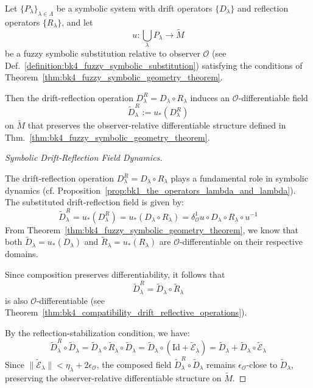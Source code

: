 \begin{theorem}
\label{thm:bk4_compatibility_drift_reflective_operations}

Let $\{P_\lambda\}_{\lambda \in \Lambda}$ be a symbolic system with drift operators $\{D_\lambda\}$ and reflection operators $\{R_\lambda\}$, and let
\[
u : \bigcup_\lambda P_\lambda \to \tilde{M}
\]
be a fuzzy symbolic substitution relative to observer $\mathcal{O}$ (see Def.~\ref{definition:bk4_fuzzy_symbolic_substitution}) satisfying the conditions of Theorem~\ref{thm:bk4_fuzzy_symbolic_geometry_theorem}.

Then the drift-reflection operation \( D_\lambda^R = D_\lambda \circ R_\lambda \) induces an $\mathcal{O}$-differentiable field
\[
\tilde{D}_\lambda^R := u_*(D_\lambda^R)
\]
on $\tilde{M}$ that preserves the observer-relative differentiable structure defined in Thm.~\ref{thm:bk4_fuzzy_symbolic_geometry_theorem}.
\end{theorem}

\begin{proof}[Symbolic Drift-Reflection Field Dynamics]
\label{proof:bk4_drift_reflection_field}

The drift-reflection operation \( D_\lambda^R = D_\lambda \circ R_\lambda \) plays a fundamental role in symbolic dynamics (cf. Proposition~\ref{prop:bk1_the_operators_lambda_and_lambda}). The substituted drift-reflection field is given by:
\[
\tilde{D}_\lambda^R = u_*(D_\lambda^R) = u_*(D_\lambda \circ R_\lambda) = \delta^1_\mathcal{O}u \circ D_\lambda \circ R_\lambda \circ u^{-1}
\]
From Theorem~\ref{thm:bk4_fuzzy_symbolic_geometry_theorem}, we know that both \( \tilde{D}_\lambda = u_*(D_\lambda) \) and \( \tilde{R}_\lambda = u_*(R_\lambda) \) are $\mathcal{O}$-differentiable on their respective domains.

Since composition preserves differentiability, it follows that
\[
\tilde{D}_\lambda^R = \tilde{D}_\lambda \circ \tilde{R}_\lambda
\]
is also $\mathcal{O}$-differentiable (see Theorem~\ref{thm:bk4_compatibility_drift_reflective_operations}).

By the reflection-stabilization condition, we have:
\[
\tilde{D}_\lambda^R \circ \tilde{D}_\lambda = \tilde{D}_\lambda \circ \tilde{R}_\lambda \circ \tilde{D}_\lambda = \tilde{D}_\lambda \circ (\text{Id} + \tilde{\mathcal{E}}_\lambda) = \tilde{D}_\lambda + \tilde{D}_\lambda \circ \tilde{\mathcal{E}}_\lambda
\]
Since \( \|\tilde{\mathcal{E}}_\lambda\| < \eta_\lambda + 2\epsilon_\mathcal{O} \), the composed field \( \tilde{D}_\lambda^R \circ \tilde{D}_\lambda \) remains \( \epsilon_\mathcal{O} \)-close to \( \tilde{D}_\lambda \), preserving the observer-relative differentiable structure on \( \tilde{M} \).

\end{proof}


